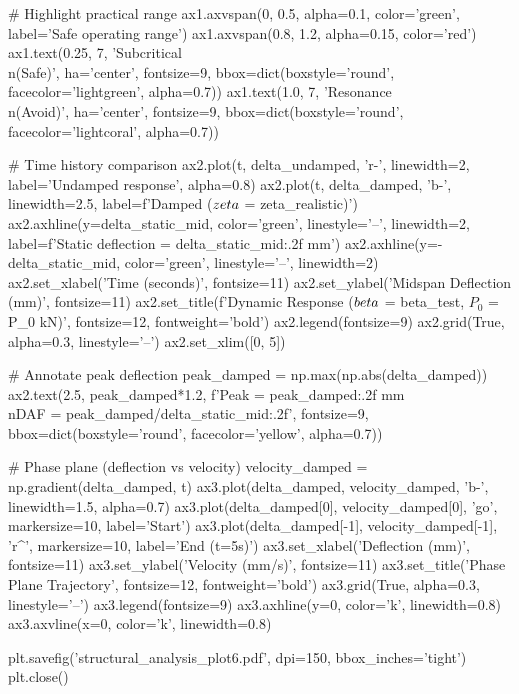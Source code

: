 \documentclass[11pt,a4paper]{article}
\begin{document}
\begin{pycode}
# Highlight practical range
ax1.axvspan(0, 0.5, alpha=0.1, color='green', label='Safe operating range')
ax1.axvspan(0.8, 1.2, alpha=0.15, color='red')
ax1.text(0.25, 7, 'Subcritical\\n(Safe)', ha='center', fontsize=9,
         bbox=dict(boxstyle='round', facecolor='lightgreen', alpha=0.7))
ax1.text(1.0, 7, 'Resonance\\n(Avoid)', ha='center', fontsize=9,
         bbox=dict(boxstyle='round', facecolor='lightcoral', alpha=0.7))

# Time history comparison
ax2.plot(t, delta_undamped, 'r-', linewidth=2, label='Undamped response', alpha=0.8)
ax2.plot(t, delta_damped, 'b-', linewidth=2.5, label=f'Damped ($\\zeta$ = {zeta_realistic})')
ax2.axhline(y=delta_static_mid, color='green', linestyle='--', linewidth=2,
            label=f'Static deflection = {delta_static_mid:.2f} mm')
ax2.axhline(y=-delta_static_mid, color='green', linestyle='--', linewidth=2)
ax2.set_xlabel('Time (seconds)', fontsize=11)
ax2.set_ylabel('Midspan Deflection (mm)', fontsize=11)
ax2.set_title(f'Dynamic Response ($\\beta$ = {beta_test}, $P_0$ = {P_0} kN)', fontsize=12, fontweight='bold')
ax2.legend(fontsize=9)
ax2.grid(True, alpha=0.3, linestyle='--')
ax2.set_xlim([0, 5])

# Annotate peak deflection
peak_damped = np.max(np.abs(delta_damped))
ax2.text(2.5, peak_damped*1.2, f'Peak = {peak_damped:.2f} mm\\nDAF = {peak_damped/delta_static_mid:.2f}',
         fontsize=9, bbox=dict(boxstyle='round', facecolor='yellow', alpha=0.7))

# Phase plane (deflection vs velocity)
velocity_damped = np.gradient(delta_damped, t)
ax3.plot(delta_damped, velocity_damped, 'b-', linewidth=1.5, alpha=0.7)
ax3.plot(delta_damped[0], velocity_damped[0], 'go', markersize=10, label='Start')
ax3.plot(delta_damped[-1], velocity_damped[-1], 'r^', markersize=10, label='End (t=5s)')
ax3.set_xlabel('Deflection (mm)', fontsize=11)
ax3.set_ylabel('Velocity (mm/s)', fontsize=11)
ax3.set_title('Phase Plane Trajectory', fontsize=12, fontweight='bold')
ax3.grid(True, alpha=0.3, linestyle='--')
ax3.legend(fontsize=9)
ax3.axhline(y=0, color='k', linewidth=0.8)
ax3.axvline(x=0, color='k', linewidth=0.8)

plt.savefig('structural_analysis_plot6.pdf', dpi=150, bbox_inches='tight')
plt.close()
\end{pycode}
\end{document}
